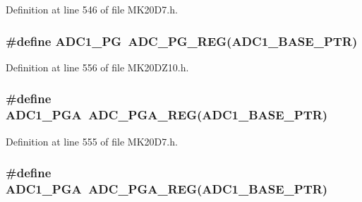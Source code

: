 Definition at line 546 of file M\+K20\+D7.\+h.

\subsubsection[{\texorpdfstring{A\+D\+C1\+\_\+\+PG}{ADC1_PG}}]{\setlength{\rightskip}{0pt plus 5cm}\#define A\+D\+C1\+\_\+\+PG~{\bf A\+D\+C\+\_\+\+P\+G\+\_\+\+R\+EG}({\bf A\+D\+C1\+\_\+\+B\+A\+S\+E\+\_\+\+P\+TR})}\hypertarget{group___a_d_c___register___accessor___macros_ga16df01cc392a34c109178ad4db48a27d}{}\label{group___a_d_c___register___accessor___macros_ga16df01cc392a34c109178ad4db48a27d}


Definition at line 556 of file M\+K20\+D\+Z10.\+h.

\subsubsection[{\texorpdfstring{A\+D\+C1\+\_\+\+P\+GA}{ADC1_PGA}}]{\setlength{\rightskip}{0pt plus 5cm}\#define A\+D\+C1\+\_\+\+P\+GA~{\bf A\+D\+C\+\_\+\+P\+G\+A\+\_\+\+R\+EG}({\bf A\+D\+C1\+\_\+\+B\+A\+S\+E\+\_\+\+P\+TR})}\hypertarget{group___a_d_c___register___accessor___macros_ga68fe83c8355cbc1f15f2747b30848dd7}{}\label{group___a_d_c___register___accessor___macros_ga68fe83c8355cbc1f15f2747b30848dd7}


Definition at line 555 of file M\+K20\+D7.\+h.

\subsubsection[{\texorpdfstring{A\+D\+C1\+\_\+\+P\+GA}{ADC1_PGA}}]{\setlength{\rightskip}{0pt plus 5cm}\#define A\+D\+C1\+\_\+\+P\+GA~{\bf A\+D\+C\+\_\+\+P\+G\+A\+\_\+\+R\+EG}({\bf A\+D\+C1\+\_\+\+B\+A\+S\+E\+\_\+\+P\+TR})}\hypertarget{group___a_d_c___register___accessor___macros_ga68fe83c8355cbc1f15f2747b30848dd7}{}\label{group___a_d_c___register___accessor___macros_ga68fe83c8355cbc1f15f2747b30848dd7}


